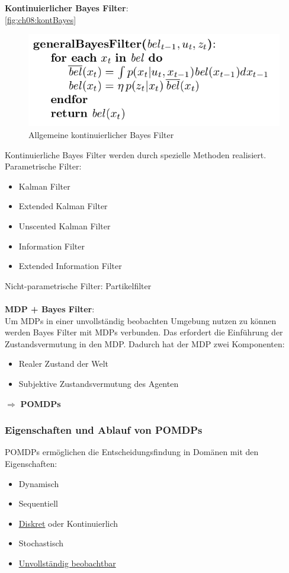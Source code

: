 \textbf{Kontinuierlicher Bayes Filter}:\\
\autoref{fig:ch08:kontBayes}
\begin{figure}[h!]
	\centering
  \includegraphics[width=0.5\linewidth]{figures/ch08_kontinuierlicherBayes.png}
\caption{Allgemeine kontinuierlicher Bayes Filter}
\label{fig:ch08:kontBayes}
\end{figure}
Kontinuierliche Bayes Filter werden durch spezielle Methoden realisiert.\\
Parametrische Filter:
\begin{itemize}
	\item Kalman Filter
	\item Extended Kalman Filter
	\item Unscented Kalman Filter
	\item Information Filter
	\item Extended Information Filter
\end{itemize}
Nicht-parametrische Filter: Partikelfilter\\ \\
\textbf{MDP + Bayes Filter}:\\
Um MDPs in einer unvollst\"andig beobachten Umgebung nutzen zu k\"onnen werden Bayes Filter mit MDPs verbunden.
Das erfordert die Einf\"uhrung der Zustandsvermutung in den MDP.
Dadurch hat der MDP zwei Komponenten:
\begin{itemize}
	\item Realer Zustand der Welt
	\item Subjektive Zustandsvermutung des Agenten
\end{itemize}
$\Rightarrow$ \textbf{POMDPs}
\subsubsection{Eigenschaften und Ablauf von POMDPs}
POMDPs ermöglichen die Entscheidungsfindung in Domänen mit den Eigenschaften:
\begin{itemize}
	\item Dynamisch
	\item Sequentiell
	\item \underline{Diskret} oder Kontinuierlich
	\item Stochastisch
	\item \underline{Unvollst\"andig beobachtbar}
\end{itemize}

